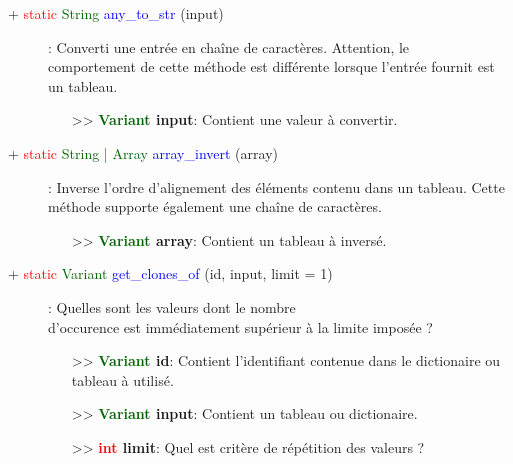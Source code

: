\documentclass[a4paper, 11pt]{article}
\begin{document}
	\begin{description}
		\item [+ \textcolor{red}{static} \textcolor{darkgreen}{String} \textcolor{blue}{any\_to\_str} 
		(input)]: Converti une entrée en chaîne de caractères. Attention, le \\comportement de cette méthode 
		est différente lorsque l'entrée fournit est un tableau.
		\begin{itemize}
			\item[>> \textbf{\textcolor{darkgreen}{Variant} input}:] Contient une valeur à convertir.\\
		\end{itemize}
	\end{description}
	\begin{description}
		\item [+ \textcolor{red}{static} \textcolor{darkgreen}{String | Array} \textcolor{blue}
		{array\_invert} (array)]: Inverse l'ordre d'alignement des éléments contenu dans un tableau. Cette
		méthode supporte également une chaîne de caractères.
		\begin{itemize}
			\item[>> \textbf{\textcolor{darkgreen}{Variant} array}:] Contient un tableau à inversé.\\
		\end{itemize}
	\end{description}
	\begin{description}
		\item [+ \textcolor{red}{static} \textcolor{darkgreen}{Variant} \textcolor{blue}{get\_clones\_of} 
		(id, input, limit = 1)]: Quelles sont les valeurs dont le nombre \\d'occurence est immédiatement 
		supérieur à la limite imposée ?
		\begin{itemize}
			\item[>> \textbf{\textcolor{darkgreen}{Variant} id}:] Contient l'identifiant contenue dans le 
			dictionaire ou tableau à utilisé.
			\item[>> \textbf{\textcolor{darkgreen}{Variant} input}:] Contient un tableau ou dictionaire.
			\item[>> \textbf{\textcolor{red}{int} limit}:] Quel est critère de répétition des valeurs ?\\
		\end{itemize}
	\end{description}
\end{document}
